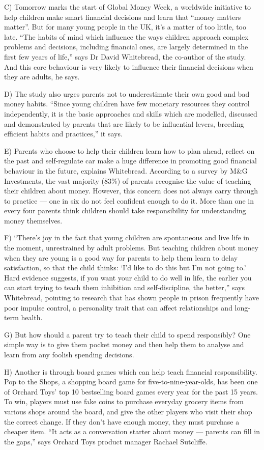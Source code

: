 \documentclass[UTF8,11pt]{ctexart}
\begin{document}
C) Tomorrow marks the start of Global Money Week, a worldwide initiative to help children make smart financial decisions and learn that “money matters matter”. But for many young people in the UK, it’s a matter of too little, too late. “The habits of mind which influence the ways children approach complex problems and decisions, including financial ones, are largely determined in the first few years of life,” says Dr David Whitebread, the co-author of the study. And this core behaviour is very likely to influence their financial decisions when they are adults, he says.


D) The study also urges parents not to underestimate their own good and bad money habits. “Since young children have few monetary resources they control independently, it is the basic approaches and skills which are modelled, discussed and demonstrated by parents that are likely to be influential levers, breeding efficient habits and practices,” it says.


E) Parents who choose to help their children learn how to plan ahead, reflect on the past and self-regulate car make a huge difference in promoting good financial behaviour in the future, explains Whitebread. According to a survey by M\&G Investments, the vast majority (83\%) of parents recognise the value of teaching their children about money. However, this concern does not always carry through to practice — one in six do not feel confident enough to do it. More than one in every four parents think children should take responsibility for understanding money themselves.


F) “There’s joy in the fact that young children are spontaneous and live life in the moment, unrestrained by adult problems. But teaching children about money when they are young is a good way for parents to help them learn to delay satisfaction, so that the child thinks: ‘I’d like to do this but I’m not going to.’ Hard evidence suggests, if you want your child to do well in life, the earlier you can start trying to teach them inhibition and self-discipline, the better,” says Whitebread, pointing to research that has shown people in prison frequently have poor impulse control, a personality trait that can affect relationships and long-term health.


G) But how should a parent try to teach their child to spend responsibly? One simple way is to give them pocket money and then help them to analyse and learn from any foolish spending decisions.


H) Another is through board games which can help teach financial responsibility. Pop to the Shops, a shopping board game for five-to-nine-year-olds, has been one of Orchard Toys’ top 10 bestselling board games every year for the past 15 years. To win, players must use fake coins to purchase everyday grocery items from various shops around the board, and give the other players who visit their shop the correct change. If they don’t have enough money, they must purchase a cheaper item. “It acts as a conversation starter about money — parents can fill in the gaps,” says Orchard Toys product manager Rachael Sutcliffe.
\end{document}
